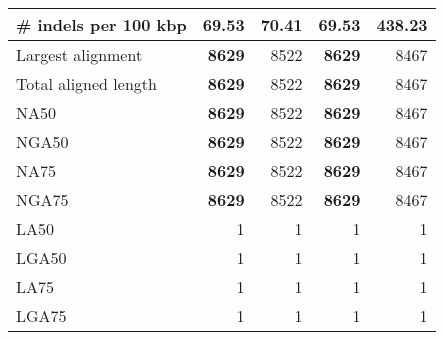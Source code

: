 \documentclass[12pt,a4paper]{article}
\begin{document}
\begin{table}[ht]
\begin{center}
\begin{tabular}{|l*{4}{|r}|}
\# indels per 100 kbp & {\bf 69.53} & 70.41 & {\bf 69.53} & 438.23 \\ \hline
Largest alignment & {\bf 8629} & 8522 & {\bf 8629} & 8467 \\ \hline
Total aligned length & {\bf 8629} & 8522 & {\bf 8629} & 8467 \\ \hline
NA50 & {\bf 8629} & 8522 & {\bf 8629} & 8467 \\ \hline
NGA50 & {\bf 8629} & 8522 & {\bf 8629} & 8467 \\ \hline
NA75 & {\bf 8629} & 8522 & {\bf 8629} & 8467 \\ \hline
NGA75 & {\bf 8629} & 8522 & {\bf 8629} & 8467 \\ \hline
LA50 & 1 & 1 & 1 & 1 \\ \hline
LGA50 & 1 & 1 & 1 & 1 \\ \hline
LA75 & 1 & 1 & 1 & 1 \\ \hline
LGA75 & 1 & 1 & 1 & 1 \\ \hline
\end{tabular}
\end{center}
\end{table}
\end{document}
